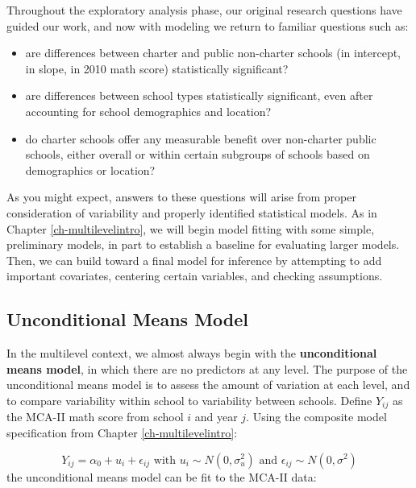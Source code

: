 \documentclass[
]{krantz}
\providecommand{\tightlist}{%
  \setlength{\itemsep}{0pt}\setlength{\parskip}{0pt}}
\begin{document}
Throughout the exploratory analysis phase, our original research questions have guided our work, and now with modeling we return to familiar questions such as:

\begin{itemize}
\tightlist
\item
  are differences between charter and public non-charter schools (in intercept, in slope, in 2010 math score) statistically significant?
\item
  are differences between school types statistically significant, even after accounting for school demographics and location?
\item
  do charter schools offer any measurable benefit over non-charter public schools, either overall or within certain subgroups of schools based on demographics or location?
\end{itemize}

As you might expect, answers to these questions will arise from proper consideration of variability and properly identified statistical models.
As in Chapter \ref{ch-multilevelintro}, we will begin model fitting with some simple, preliminary models, in part to establish a baseline for evaluating larger models. Then, we can build toward a final model for inference by attempting to add important covariates, centering certain variables, and checking assumptions.

\hypertarget{modela}{%
\subsection{Unconditional Means Model}\label{modela}}

In the multilevel context, we almost always begin with the \textbf{unconditional means model},  in which there are no predictors at any level. The purpose of the unconditional means model is to assess the amount of variation at each level, and to compare variability within school to variability between schools. Define \(Y_{ij}\) as the MCA-II math score from school \(i\) and year \(j\). Using the composite model specification from Chapter \ref{ch-multilevelintro}:

\begin{equation*}
Y _{ij} = \alpha_{0} + u_{i} + \epsilon_{ij} \textrm{ with } u_{i} \sim N(0, \sigma^2_u) \textrm{ and } \epsilon_{ij} \sim N(0, \sigma^2)
\end{equation*}
the unconditional means model can be fit to the MCA-II data:
\end{document}
